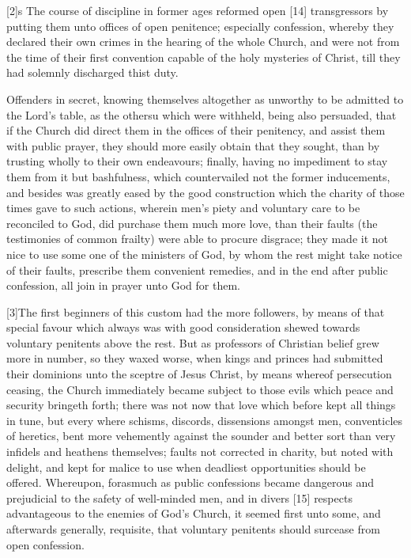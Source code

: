 [2]s The course of discipline in former ages reformed open [14] transgressors by putting them unto offices of open penitence; especially confession, whereby they declared their own crimes in the hearing of the whole Church, and were not from the time of their first convention capable of the holy mysteries of Christ, till they had solemnly discharged thist duty.

Offenders in secret, knowing themselves altogether as unworthy to be admitted to the Lord’s table, as the othersu which were withheld, being also persuaded, that if the Church did direct them in the offices of their penitency, and assist them with public prayer, they should more easily obtain that they sought, than by trusting wholly to their own endeavours; finally, having no impediment to stay them from it but bashfulness, which countervailed not the former inducements, and besides was greatly eased by the good construction which the charity of those times gave to such actions, wherein men’s piety and voluntary care to be reconciled to God, did purchase them much more love, than their faults (the testimonies of common frailty) were able to procure disgrace; they made it not nice to use some one of the ministers of God, by whom the rest might take notice of their faults, prescribe them convenient remedies, and in the end after public confession, all join in prayer unto God for them.

[3]The first beginners of this custom had the more followers, by means of that special favour which always was with good consideration shewed towards voluntary penitents above the rest. But as professors of Christian belief grew more in number, so they waxed worse, when kings and princes had submitted their dominions unto the sceptre of Jesus Christ, by means whereof persecution ceasing, the Church immediately became subject to those evils which peace and security bringeth forth; there was not now that love which before kept all things in tune, but every where schisms, discords, dissensions amongst men, conventicles of heretics, bent more vehemently against the sounder and better sort than very infidels and heathens themselves; faults not corrected in charity, but noted with delight, and kept for malice to use when deadliest opportunities should be offered. Whereupon, forasmuch as public confessions became dangerous and prejudicial to the safety of well-minded men, and in divers [15] respects advantageous to the enemies of God’s Church, it seemed first unto some, and afterwards generally, requisite, that voluntary penitents should surcease from open confession.

